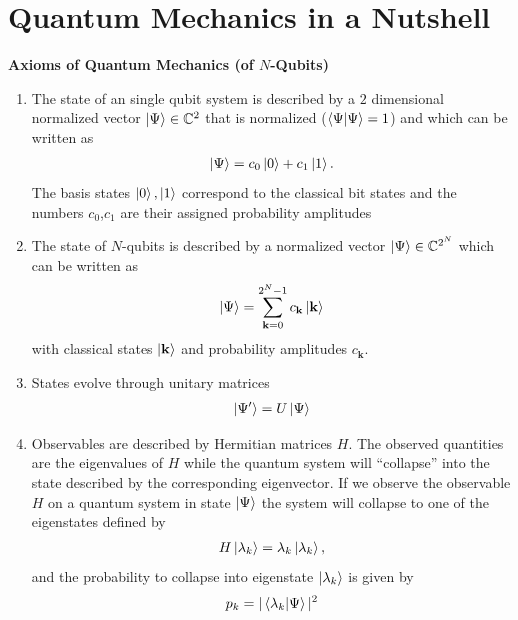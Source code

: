 \section{Quantum Mechanics in a Nutshell}

\begin{highlight}
    \textbf{Axioms of Quantum Mechanics (of $N$-Qubits)}
    \begin{enumerate}
        \item[1a] The state of an single qubit system is described by a $2$ dimensional normalized vector  $\ket{\Psi} \in \mathbb{C}^2$ that is normalized ($\braket{\Psi}{\Psi}=1$) and which can be written as
        \begin{align*}
            \ket{\Psi} = c_0 \ket{0} + c_1 \ket{1}.
        \end{align*}
        The basis states $\ket{0}, \ket{1}$ correspond to the classical bit states and the numbers $c_0$,$c_1$ are their assigned probability amplitudes
        \item[1b] The state of $N$-qubits is described by a normalized vector $\ket{\Psi}\in\mathbb{C}^{2^N}$ which can be written as
        \begin{align*}
            \ket{\Psi} = \sum_{\mathbf{k}=0}^{2^N-1} c_\mathbf{k}\ket{\mathbf{k}}
        \end{align*}
        with classical states $\ket{\mathbf{k}}$ and probability amplitudes $c_{\mathbf{k}}$.
        \item[2] States evolve through unitary matrices
        \begin{align*}
            \ket{\Psi'} = U \ket{\Psi}
        \end{align*}
        \item[3] Observables are described by Hermitian matrices $H$. The observed quantities are the eigenvalues of $H$ while the quantum system will ``collapse'' into the state described by the corresponding eigenvector. If we observe the observable $H$ on a quantum system in state $\ket{\Psi}$ the system will collapse to one of the eigenstates defined by
        \begin{align*}
            H\ket{\lambda_k} = \lambda_k \ket{\lambda_k},
        \end{align*}
        and the probability to collapse into eigenstate $\ket{\lambda_k}$ is given by
        \begin{align*}
            p_k = |\braket{\lambda_k}{\Psi}|^2 
        \end{align*}
    \end{enumerate}
\end{highlight}

